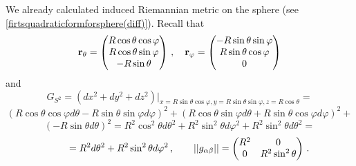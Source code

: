 \documentclass[12pt]{article}
\theoremstyle{theorem}
\numberwithin{equation}{section}
\begin{document}
We already calculated induced Riemannian metric on the sphere (see \eqref{firtsquadraticformforsphere(diff)}).
 Recall that
    $$
  {\bf r}_\theta=\begin{pmatrix}
        R\cos\theta\cos\varphi\\
        R\cos\theta\sin\varphi\\
        -R\sin\theta\\
   \end{pmatrix}\,,
\quad
  {\bf r}_\varphi=\begin{pmatrix}
        -R\sin\theta\sin\varphi\\
        R\sin\theta\cos\varphi\\
          0\\
   \end{pmatrix}
  $$
 and
            $$
              G_{S^2}=\left(dx^2+dy^2+dz^2\right)\big\vert_{x=R\sin\theta\cos\varphi,y=R\sin\theta\sin\varphi,
              z=R\cos\theta}=
                      $$
                      $$
                      (R\cos\theta\cos\varphi d\theta-R\sin\theta\sin\varphi d\varphi)^2+
                      (R\cos\theta\sin\varphi d\theta+R\sin\theta\cos\varphi d\varphi)^2+
                      $$
                      $$
                      (-R\sin\theta d\theta)^2=
          R^2\cos^2\theta d\theta^2+R^2\sin^2\theta d\varphi^2+R^2\sin^2\theta d\theta^2=
                      $$
        \begin{equation*}\label{firtsquadraticformforsphere(diff)}
           \qquad
             =R^2d\theta^2+R^2\sin^2\theta d\varphi^2\,,\qquad
                        ||g_{\alpha\beta}||=
   \begin{pmatrix}
   R^2 & 0 \\
   0&  R^2\sin^2\theta \\
   \end{pmatrix}\,.
                       \end{equation*}
\end{document}
